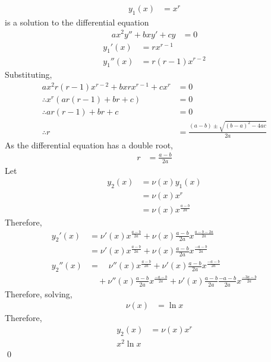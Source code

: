 \documentclass[fleqn, a4paper, 11pt, oneside]{amsart}
\theoremstyle{definition}
\theoremstyle{theorem}
\begin{document}
\begin{solution}
	\begin{align*}
		y_1(x) & = x^r
	\end{align*}
	is a solution to the differential equation
	\begin{align*}
		a x^2 y'' + b x y' + c y & = 0
	\end{align*}
	\begin{align*}
		{y_1}'(x)  & = r x^{r - 1} \\
		{y_1}''(x) & = r (r - 1) x^{r - 2}
	\end{align*}
	Substituting,
	\begin{align*}
		a x^2 r (r - 1) x^{r - 2} + b x r x^{r - 1} + c x^r & = 0 \\
		\therefore x^r \left( a r (r - 1) + b r + c \right) & = 0 \\
		\therefore a r (r - 1) + b r + c                    & = 0 \\
		\therefore r                                        & = \frac{(a - b) \pm \sqrt{(b - a)^2 - 4 a c}}{2 a}
	\end{align*}
	As the differential equation has a double root,
	\begin{align*}
		r & = \frac{a - b}{2 a}
	\end{align*}
	Let
	\begin{align*}
		y_2(x) & = \nu(x) y_1(x) \\
                       & = \nu(x) x^r    \\
                       & = \nu(x) x^{\frac{a - b}{2 a}}
	\end{align*}
	Therefore,
	\begin{align*}
		{y_2}'(x)  & = \nu'(x) x^{\frac{a - b}{2 a}} + \nu(x) \frac{a - b}{2 a} x^{\frac{a - b - 2 a}{2 a}}    \\
                           & = \nu'(x) x^{\frac{a - b}{2 a}} + \nu(x) \frac{a - b}{2 a} x^{\frac{-a - b}{2 a}}         \\
		{y_2}''(x) & = \quad \nu''(x) x^{\frac{a - b}{2 a}} + \nu'(x) \frac{a - b}{2 a} x^{\frac{-a - b}{2 a}} \\
                           & \quad + \nu''(x) \frac{a - b}{2 a} x^{\frac{-a - b}{2 a}} + \nu'(x) \frac{a - b}{2 a} \frac{-a - b}{2 a} x^{\frac{-3 a - b}{2 a}}
	\end{align*}
	Therefore, solving,
	\begin{align*}
		\nu(x) & = \ln x
	\end{align*}
	Therefore,
	\begin{align*}
		y_2(x) & = \nu(x) x^r \\
		x^2 \ln x
	\end{align*}
	\qed
\end{solution}
\end{document}
